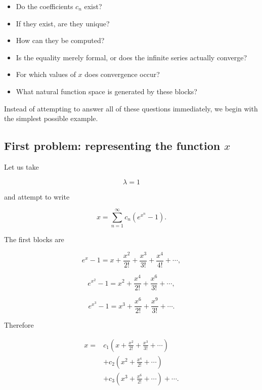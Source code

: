 \begin{itemize}

    \item Do the coefficients \(c_n\) exist?

    \item If they exist, are they unique?

    \item How can they be computed?

    \item Is the equality merely formal, or does the infinite series
    actually converge?

    \item For which values of \(x\) does convergence occur?

    \item What natural function space is generated by these blocks?

\end{itemize}

Instead of attempting to answer all of these questions immediately, we
begin with the simplest possible example.

\subsection{First problem: representing the function \texorpdfstring{$x$}{x}}

Let us take

\[
\lambda=1
\]

and attempt to write

\[
\boxed{
x
=
\sum_{n=1}^{\infty}
c_n
\left(
e^{x^n}-1
\right).
}
\]

The first blocks are

\[
e^x-1
=
x+\frac{x^2}{2!}+\frac{x^3}{3!}
+\frac{x^4}{4!}+\cdots,
\]

\[
e^{x^2}-1
=
x^2+\frac{x^4}{2!}+\frac{x^6}{3!}+\cdots,
\]

\[
e^{x^3}-1
=
x^3+\frac{x^6}{2!}+\frac{x^9}{3!}+\cdots.
\]

Therefore

\[
\begin{aligned}
x
={}&
c_1
\left(
x+\frac{x^2}{2!}+\frac{x^3}{3!}+\cdots
\right)
\\
&+
c_2
\left(
x^2+\frac{x^4}{2!}+\cdots
\right)
\\
&+
c_3
\left(
x^3+\frac{x^6}{2!}+\cdots
\right)
+\cdots.
\end{aligned}
\]

